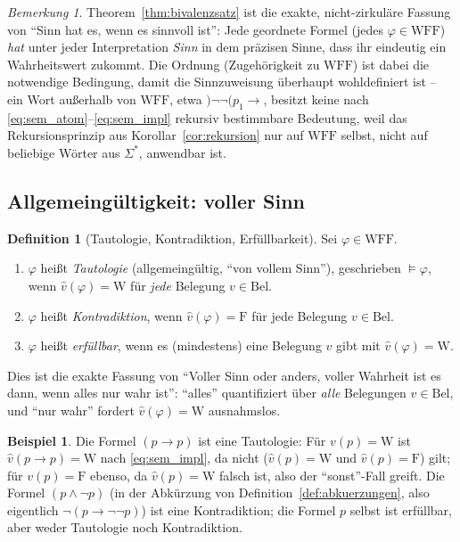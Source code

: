 \documentclass[12pt, a4paper]{article}
\theoremstyle{definition}
\newtheorem{definition}[theorem]{Definition}
\newtheorem{example}[theorem]{Beispiel}
\theoremstyle{remark}
\newtheorem{remark}[theorem]{Bemerkung}
\newcommand{\W}{\mathrm{W}}
\newcommand{\F}{\mathrm{F}}
\newcommand{\WFF}{\mathrm{WFF}}
\newcommand{\Bel}{\mathrm{Bel}}
\begin{document}
\begin{remark}
\label{rem:bivalenzsatz_bedeutung}
Theorem~\ref{thm:bivalenzsatz} ist die exakte, nicht-zirkuläre Fassung von ``Sinn hat es, wenn es sinnvoll ist'': Jede geordnete Formel (jedes $\varphi \in \WFF$) \emph{hat} unter jeder Interpretation \emph{Sinn} in dem präzisen Sinne, dass ihr eindeutig ein Wahrheitswert zukommt. Die Ordnung (Zugehörigkeit zu $\WFF$) ist dabei die notwendige Bedingung, damit die Sinnzuweisung überhaupt wohldefiniert ist -- ein Wort außerhalb von $\WFF$, etwa $)\neg\neg(p_1\to{}$, besitzt keine nach \eqref{eq:sem_atom}--\eqref{eq:sem_impl} rekursiv bestimmbare Bedeutung, weil das Rekursionsprinzip aus Korollar~\ref{cor:rekursion} nur auf $\WFF$ selbst, nicht auf beliebige Wörter aus $\Sigma^\ast$, anwendbar ist.
\end{remark}

\subsection{Allgemeingültigkeit: voller Sinn}
\label{subsec:tautologie}

\begin{definition}[Tautologie, Kontradiktion, Erfüllbarkeit]
\label{def:tautologie}
Sei $\varphi \in \WFF$.
\begin{enumerate}[label=(\alph*)]
  \item $\varphi$ heißt \emph{Tautologie} (allgemeingültig, ``von vollem Sinn''), geschrieben $\models \varphi$, wenn $\hat v(\varphi) = \W$ für \emph{jede} Belegung $v \in \Bel$.
  \item $\varphi$ heißt \emph{Kontradiktion}, wenn $\hat v(\varphi) = \F$ für jede Belegung $v \in \Bel$.
  \item $\varphi$ heißt \emph{erfüllbar}, wenn es (mindestens) eine Belegung $v$ gibt mit $\hat v(\varphi) = \W$.
\end{enumerate}
\end{definition}

Dies ist die exakte Fassung von ``Voller Sinn oder anders, voller Wahrheit ist es dann, wenn alles nur wahr ist'': ``alles'' quantifiziert über \emph{alle} Belegungen $v \in \Bel$, und ``nur wahr'' fordert $\hat v(\varphi) = \W$ ausnahmslos.

\begin{example}
\label{ex:tautologien}
Die Formel $(p \to p)$ ist eine Tautologie: Für $v(p)=\W$ ist $\hat v(p\to p) = \W$ nach \eqref{eq:sem_impl}, da nicht ($\hat v(p)=\W$ und $\hat v(p)=\F$) gilt; für $v(p)=\F$ ebenso, da $\hat v(p)=\W$ falsch ist, also der ``sonst''-Fall greift. Die Formel $(p \land \neg p)$ (in der Abkürzung von Definition~\ref{def:abkuerzungen}, also eigentlich $\neg(p\to\neg\neg p)$) ist eine Kontradiktion; die Formel $p$ selbst ist erfüllbar, aber weder Tautologie noch Kontradiktion.
\end{example}
\end{document}
